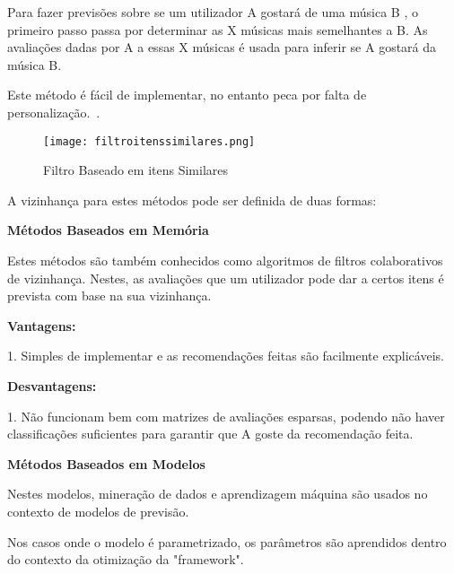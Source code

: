 \hfill

 \par Para fazer previsões sobre se um utilizador A gostará de uma música B , o primeiro passo passa por determinar as X músicas mais semelhantes a B. As avaliações dadas por A a essas X músicas é usada para inferir se A gostará da música B.

 \par Este método é fácil de implementar, no entanto peca por falta de personalização.~\cite{ref_article1}.\newline

\begin{figure}[H]

  \centering

  \texttt{[image: filtroitenssimilares.png]}

  \caption{Filtro Baseado em itens Similares}

  \label{fig02}

\end{figure}
\par A vizinhança para estes métodos pode ser definida de duas formas:



\begin{center}
\normalsize{\bfseries Métodos Baseados em Memória}\hfill
\end{center}

 \par Estes métodos são também conhecidos como algoritmos de filtros colaborativos de vizinhança. Nestes, as avaliações que um utilizador pode dar a certos itens é prevista com base na sua vizinhança.\newline

\textbf{Vantagens:}\hfill
\hfill
\par 1. Simples de implementar e as recomendações feitas são facilmente explicáveis.\newline

\textbf{Desvantagens:}\hfill
\hfill
\par 1. Não funcionam bem com matrizes de avaliações esparsas, podendo não haver classificações suficientes para garantir que A goste da recomendação feita.\newline

\begin{center}
\normalsize{\bfseries Métodos Baseados em Modelos}\hfill
\end{center}
\hfill
\par Nestes modelos, mineração de dados e aprendizagem máquina são usados no contexto de modelos de previsão.
\par Nos casos onde o modelo é parametrizado, os parâmetros são aprendidos dentro do contexto da otimização da "framework".





